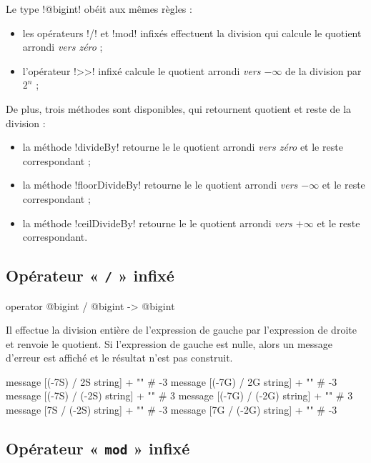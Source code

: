Le type \ggsq!@bigint! obéit aux mêmes règles :
\begin{itemize}
\item les opérateurs \ggsq!/! et \ggsq!mod! infixés effectuent la division qui calcule le quotient arrondi \emph{vers zéro} ;
  \item l'opérateur \ggsq!>>! infixé calcule le quotient arrondi \emph{vers $-\infty$} de la division par $2^n$ ;
\end{itemize}

De plus, trois méthodes sont disponibles, qui retournent quotient et reste de la division :
\begin{itemize}
  \item la méthode \ggsq!divideBy! retourne le le quotient arrondi \emph{vers zéro} et le reste correspondant ;
  \item la méthode \ggsq!floorDivideBy! retourne le le quotient arrondi \emph{vers $-\infty$} et le reste correspondant ;
  \item la méthode \ggsq!ceilDivideBy! retourne le le quotient arrondi \emph{vers $+\infty$} et le reste correspondant.
\end{itemize}


\subsection{Opérateur « \texttt{/} » infixé}

\begin{galgas4box}
operator @bigint / @bigint -> @bigint
\end{galgas4box}

Il effectue la division entière de l'expression de gauche par l'expression de droite et renvoie le quotient. Si l'expression de gauche est nulle, alors un message d'erreur est affiché et le résultat n'est pas construit.

\begin{galgas4}
message [(-7S) / 2S string] + "\n" # -3
message [(-7G) / 2G string] + "\n" # -3
message [(-7S) / (-2S) string] + "\n" # 3
message [(-7G) / (-2G) string] + "\n" # 3
message [7S / (-2S) string] + "\n" # -3
message [7G / (-2G) string] + "\n" # -3
\end{galgas4}



\subsection{Opérateur « \texttt{mod} » infixé}

